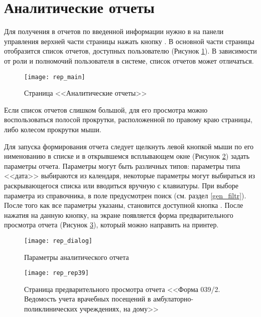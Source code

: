 \newpage
\section{Аналитические отчеты}

Для получения в \tmis отчетов по введенной информации нужно в на панели управления верхней части страницы нажать кнопку . В основной части страницы отобразится список отчетов, доступных пользователю (Рисунок \ref{img_rep_main}). В зависимости от роли и полномочий пользователя в системе, список отчетов может отличаться.

\begin{figure}[ht]\centering
	\texttt{[image: rep\_main]}
	\caption{Страница <<Аналитические отчеты>>}
	\label{img_rep_main}
\end{figure}

Если список отчетов слишком большой, для его просмотра можно воспользоваться полосой прокрутки, расположенной по правому краю страницы, либо колесом прокрутки мыши.

Для запуска формирования отчета следует щелкнуть левой кнопкой мыши по его нименованию в списке и в открывшемся всплывающем окне (Рисунок \ref{img_rep_dialog}) задать параметры отчета. Параметры могут быть различных типов: параметры типа <<дата>> выбираются из календаря, некоторые параметры могут выбираться из раскрывающегося списка или вводиться вручную с клавиатуры. При выборе параметра из справочника, в поле предусмотрен поиск (см. раздел \ref{gen_filtr}). После того как все параметры указаны, становится доступной кнопка . После нажатия на данную кнопку, на экране появляется форма предварительного просмотра отчета (Рисунок \ref{img_rep_rep39}), который можно направить на принтер.

\begin{figure}[ht]\centering
	\texttt{[image: rep\_dialog]}
	\caption{Параметры аналитического отчета}
	\label{img_rep_dialog}
\end{figure}

\begin{figure}[ht]\centering
	\texttt{[image: rep\_rep39]}
	\caption{Страница предварительного просмотра отчета <<Форма 039/2. Ведомость учета врачебных посещений в амбулаторно-поликлинических учреждениях, на дому>>}
	\label{img_rep_rep39}
\end{figure}